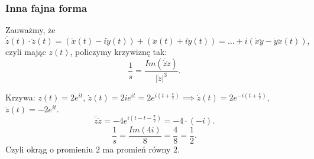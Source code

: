 \documentclass[../main.tex]{subfiles}
\begin{document}
        \subsubsection{Inna fajna forma}
        Zauważmy, że $\overline{\dot{z}}(t) \cdot \ddot{z}(t) = \left( \dot{x}(t) - i\dot{y}(t) \right) + \left( \ddot{x}(t) + i\ddot{y}(t) \right) = \ldots + i\left( \dot{x}\ddot{y} - \dot{y}\ddot{x}(t) \right),$ czyli mając $z(t)$, policzymy krzywiznę tak:
        \[
            \frac{1}{s} = \frac{Im(\overline{\dot{z}}\ddot{z})}{\left| \dot{z} \right| ^3}
        .\]
    \begin{przyklad}
        Krzywa: $z(t) = 2e^{it}$, $\dot{z}(t) = 2ie^{it} = 2e^{i(t+\frac{\pi}{2})} \implies \overline{\dot{z}}(t) = 2e^{-i(t + \frac{\pi}{2})}$, $\ddot{z}(t) = -2e^{it}$.
        \[
            \overline{\dot{z}}\ddot{z} = -4 e^{i(t-t-\frac{\pi}{2})} = -4 \cdot (-i)
        .\]
    \[
        \frac{1}{s} = \frac{Im(4i)}{8} = \frac{4}{8} = \frac{1}{2}
    .\]
Czyli okrąg o promieniu $2$ ma promień równy $2$.
    \end{przyklad}
\end{document}
